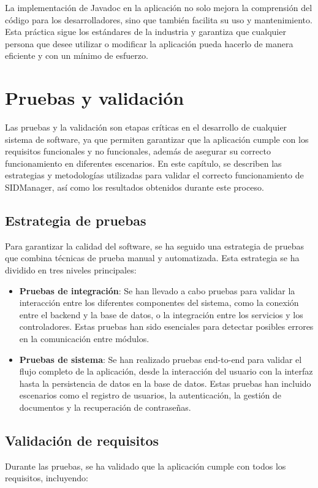 \documentclass[draft]{scrbook}
\begin{document}
La implementación de Javadoc en la aplicación no solo mejora la comprensión del código para los desarrolladores, sino que también facilita su uso y mantenimiento. Esta práctica sigue los estándares de la industria y garantiza que cualquier persona que desee utilizar o modificar la aplicación pueda hacerlo de manera eficiente y con un mínimo de esfuerzo.




\chapter{Pruebas y validación}\label{pruebas}
Las pruebas y la validación son etapas críticas en el desarrollo de cualquier sistema de software, ya que permiten garantizar que la aplicación cumple con los requisitos funcionales y no funcionales, además de asegurar su correcto funcionamiento en diferentes escenarios. En este capítulo, se describen las estrategias y metodologías utilizadas para validar el correcto funcionamiento de SIDManager, así como los resultados obtenidos durante este proceso.

\section{Estrategia de pruebas}
Para garantizar la calidad del software, se ha seguido una estrategia de pruebas que combina técnicas de prueba manual y automatizada. Esta estrategia se ha dividido en tres niveles principales:

\begin{itemize}    
    \item \textbf{Pruebas de integración}: Se han llevado a cabo pruebas para validar la interacción entre los diferentes componentes del sistema, como la conexión entre el backend y la base de datos, o la integración entre los servicios y los controladores. Estas pruebas han sido esenciales para detectar posibles errores en la comunicación entre módulos.
    
    \item \textbf{Pruebas de sistema}: Se han realizado pruebas end-to-end para validar el flujo completo de la aplicación, desde la interacción del usuario con la interfaz hasta la persistencia de datos en la base de datos. Estas pruebas han incluido escenarios como el registro de usuarios, la autenticación, la gestión de documentos y la recuperación de contraseñas.
\end{itemize}

\section{Validación de requisitos}
Durante las pruebas, se ha validado que la aplicación cumple con todos los requisitos, incluyendo:
\end{document}
